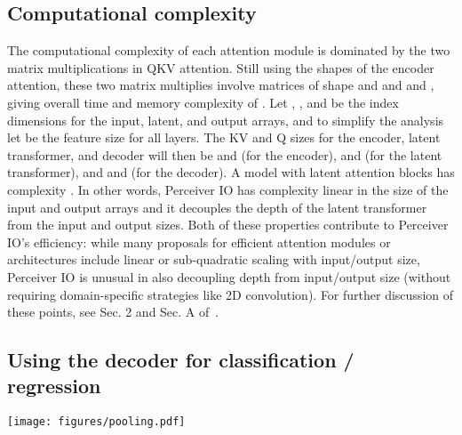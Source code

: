 \documentclass{article} \usepackage{iclr2022_conference,times}
\newcommand{\ourmodel}{Perceiver IO\xspace}
\begin{document}
\subsection{Computational complexity}
\label{sec:complexity}
The computational complexity of each attention module is dominated by the two matrix multiplications in QKV attention. Still using the shapes of the encoder attention, these two matrix multiplies involve matrices of shape  and  and  and , giving overall time and memory complexity of .
Let , , and  be the index dimensions for the input, latent, and output arrays, and
to simplify the analysis let  be the feature size for all layers.
The KV and Q sizes for the 
encoder, latent transformer,
and decoder will then be
 and 
(for the encoder),
 and 
(for the latent transformer),
and  and 
(for the decoder).
A model with  latent attention blocks has complexity . 
In other words, \ourmodel{} has complexity linear in the size of the input and output arrays and it decouples the depth of the latent transformer from the input and output sizes. Both of these properties contribute to \ourmodel{}'s efficiency: while many proposals for efficient attention modules or architectures include linear or sub-quadratic scaling with input/output size, \ourmodel{} is unusual in also decoupling depth from input/output size (without requiring domain-specific strategies like 2D convolution). For further discussion of these points, see Sec. 2 and Sec. A of~\cite{jaegle2021perceiver}.

\subsection{Using the decoder for classification / regression}
\label{sec:decoding}

\begin{figure*}[t]
    \centering
    \texttt{[image: figures/pooling.pdf]}
    \caption{Single-query attention decoder (left), as used in \ourmodel for classification tasks and a standard average + project decoder (right), as used in \cite{jaegle2021perceiver}. Both modules can be seen as first \textcolor{red}{aggregating latents by weighted averaging} (learned, data-dependent weighting for the attention decoder; uniform weights for the average + project decoder) and then \textcolor{blue}{projecting to an output channel dimension} (linear value projection + MLP for the attention decoder; simple linear projection by the average + project decoder). Attentional decoding is more expressive than average + project decoding and follows the same architectural template as encoder and processor modules.}
    \label{fig:decoder_pooling}
    \vspace{-8pt}
\end{figure*}
\end{document}
